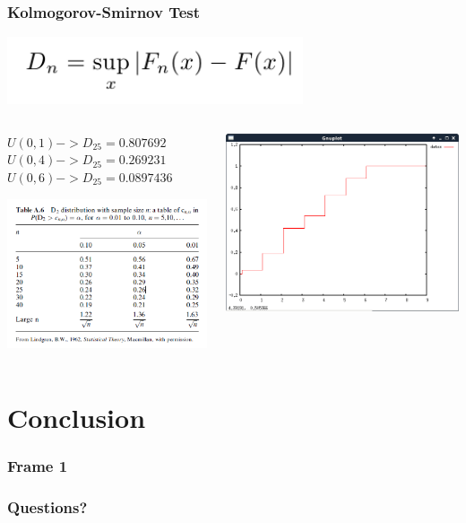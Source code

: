 \documentclass{beamer}
\begin{document}
\begin{frame}
\frametitle{Kolmogorov-Smirnov Test}
\begin{center}
\includegraphics[scale=0.35]{kst1}
\end{center}
\begin{columns}
\begin{column}{0.5\textwidth}
\begin{center}
$U(0,1) -> D_{25} = 0.807692$
$U(0,4) -> D_{25} = 0.269231$
$U(0,6) -> D_{25} = 0.0897436$
\end{center}


\includegraphics[scale=0.38]{kst2}
\end{column}
\begin{column}{0.5\textwidth}
\includegraphics[scale=0.25]{kst3}
\end{column}
\end{columns}
\end{frame}



\section{Conclusion}
\begin{frame}
\frametitle{Frame 1}
\end{frame}

\begin{frame}
\frametitle{Questions?}
\end{frame}
\end{document}
